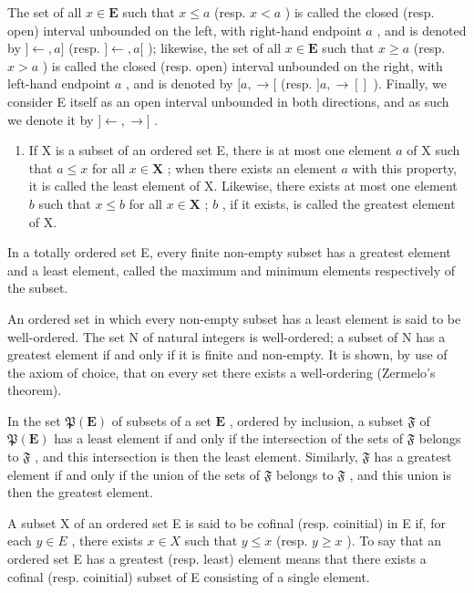 The set of all \(x \in \mathbf{E}\) such that \(x \leqslant a\) (resp. \(x < a\) ) is called the closed (resp. open) interval unbounded on the left, with right-hand endpoint \(a\) , and is denoted by \(] \leftarrow, a]\) (resp. \(] \leftarrow, a[\) ); likewise, the set of all \(x \in \mathbf{E}\) such that \(x \geqslant a\) (resp. \(x > a\) ) is called the closed (resp. open) interval unbounded on the right, with left-hand endpoint \(a\) , and is denoted by \([a, \rightarrow[\) (resp. \(]a, \rightarrow[]\) ). Finally, we consider E itself as an open interval unbounded in both directions, and as such we denote it by \(] \leftarrow, \rightarrow]\) .

\begin{enumerate}
\def\labelenumi{\arabic{enumi}.}
\setcounter{enumi}{4}
\tightlist
\item
  If X is a subset of an ordered set E, there is at most one element \(a\) of X such that \(a \leqslant x\) for all \(x \in \mathbf{X}\) ; when there exists an element \(a\) with this property, it is called the least element of X. Likewise, there exists at most one element \(b\) such that \(x \leqslant b\) for all \(x \in \mathbf{X}\) ; \(b\) , if it exists, is called the greatest element of X.
\end{enumerate}

In a totally ordered set E, every finite non-empty subset has a greatest element and a least element, called the maximum and minimum elements respectively of the subset.

An ordered set in which every non-empty subset has a least element is said to be well-ordered. The set N of natural integers is well-ordered; a subset of N has a greatest element if and only if it is finite and non-empty. It is shown, by use of the axiom of choice, that on every set there exists a well-ordering (Zermelo's theorem).

In the set \(\mathfrak{P}(\mathbf{E})\) of subsets of a set \(\mathbf{E}\) , ordered by inclusion, a subset \(\mathfrak{F}\) of \(\mathfrak{P}(\mathbf{E})\) has a least element if and only if the intersection of the sets of \(\mathfrak{F}\) belongs to \(\mathfrak{F}\) , and this intersection is then the least element. Similarly, \(\mathfrak{F}\) has a greatest element if and only if the union of the sets of \(\mathfrak{F}\) belongs to \(\mathfrak{F}\) , and this union is then the greatest element.

A subset X of an ordered set E is said to be cofinal (resp. coinitial) in E if, for each \(y \in E\) , there exists \(x \in X\) such that \(y \leqslant x\) (resp. \(y \geqslant x\) ). To say that an ordered set E has a greatest (resp. least) element means that there exists a cofinal (resp. coinitial) subset of E consisting of a single element.

